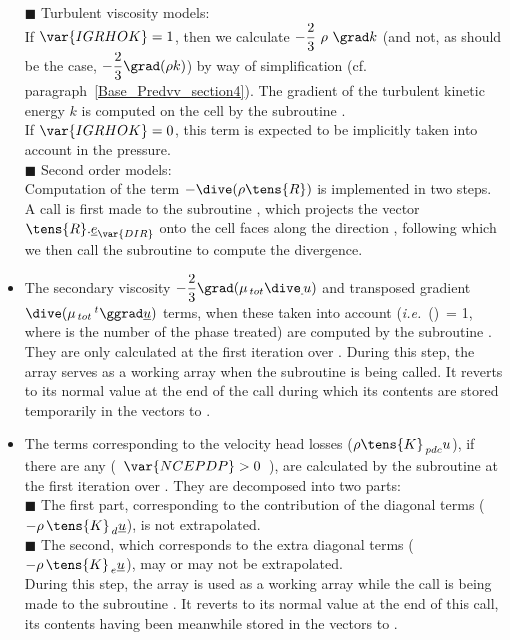 \begin{itemize}
{\tiny$\blacksquare$} Turbulent viscosity models:\\
If $\var{IGRHOK}=1$, then we calculate $-\displaystyle \frac{2}{3}\ \rho\ \grad k$ (and not, as should be the case,
$-\displaystyle \frac{2}{3}\grad (\rho k)$) by way of simplification
(cf. paragraph~\ref{Base_Predvv_section4}). The gradient of the turbulent kinetic energy $k$ is computed on the cell by the subroutine . \\
If $\var{IGRHOK}=0$, this term is expected to be implicitly taken into account in the pressure.\\
{\tiny$\blacksquare$} Second order models:\\
Computation of the term $-\dive(\rho \tens{R})$ is implemented in two steps. A call is first made to the subroutine , which projects the vector $\tens{R}.\underline{e}_{\var{DIR}}$ onto the cell faces along the direction , following which we then call the subroutine  to compute the divergence.\\
\linebreak
\item The secondary viscosity $- \displaystyle \frac {2} {3}\grad (\mu_{\,tot} \dive \underline\,{u})$ and transposed gradient $ \dive (\mu_{\,tot} \,^t\ggrad \underline {u})$ terms, when these taken into account (\emph{i.e.} \,()\ = 1, where  is the number of the phase treated) are computed by the subroutine . They are only calculated at the first iteration over . During this step, the array  serves as a working array when the subroutine   is being called. It reverts to its normal value at the end of the call during which its contents are stored temporarily in the vectors  to .
\\
\item The terms corresponding to the velocity head losses ($\rho \tens{K}_{\,pdc}
{u}$), if there are any (\ $\var{NCEPDP}> 0$\ ), are calculated by the subroutine  at the first iteration over . They are decomposed into two parts:\\
{\tiny$\blacksquare$} The first part, corresponding to the contribution of the diagonal terms ($-\rho\,\tens{K}_{\,d}\underline{u}$), is not extrapolated.\\
{\tiny$\blacksquare$} The second, which corresponds to the extra diagonal terms
($-\rho\,\tens{K}_{\,e}\underline{u}$), may or may not be extrapolated.\\
During this step, the array  is used as a working array while the call is being made to the subroutine . It reverts to its normal value at the end of this call, its contents having been meanwhile stored in the vectors  to .

\end{itemize}


